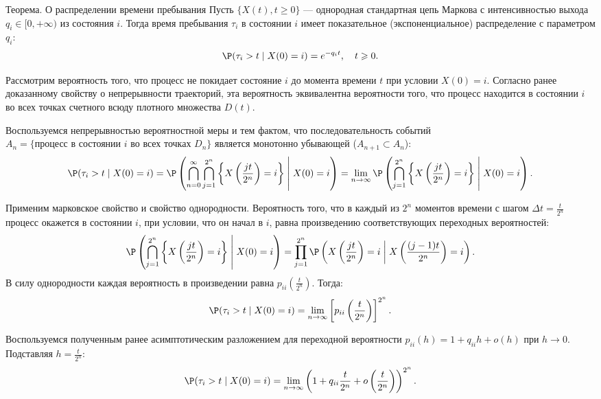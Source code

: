 \begin{theorem}{Теорема. О распределении времени пребывания}
    Пусть $\{X(t), t \geqslant 0\}$ — однородная стандартная цепь Маркова с интенсивностью выхода $q_i \in [0, +\infty)$ из состояния $i$. Тогда время пребывания $\tau_i$ в состоянии $i$ имеет показательное (экспоненциальное) распределение с параметром $q_i$:
    \[
        \P(\tau_i > t \mid X(0) = i) = e^{-q_i t}, \quad t \geqslant 0.
    \]
\end{theorem}

\begin{tproof}
    Рассмотрим вероятность того, что процесс не покидает состояние $i$ до момента времени $t$ при условии $X(0)=i$. Согласно ранее доказанному свойству о непрерывности траекторий, эта вероятность эквивалентна вероятности того, что процесс находится в состоянии $i$ во всех точках счетного всюду плотного множества $D(t)$.
    
    Воспользуемся непрерывностью вероятностной меры и тем фактом, что последовательность событий $A_n = \{ \text{процесс в состоянии } i \text{ во всех точках } D_n \}$ является монотонно убывающей ($A_{n+1} \subset A_n$):
    \[
        \P(\tau_i > t \mid X(0)=i) = \P\left( \bigcap_{n=0}^{\infty} \bigcap_{j=1}^{2^n} \left\{ X\left( \frac{jt}{2^n} \right) = i \right\} \;\middle|\; X(0)=i \right) = \linebreak \lim_{n \to \infty} \P\left( \bigcap_{j=1}^{2^n} \left\{ X\left( \frac{jt}{2^n} \right) = i \right\} \;\middle|\; X(0)=i \right).
    \]

    Применим марковское свойство и свойство однородности. Вероятность того, что в каждый из $2^n$ моментов времени с шагом $\Delta t = \frac{t}{2^n}$ процесс окажется в состоянии $i$, при условии, что он начал в $i$, равна произведению соответствующих переходных вероятностей:
    \[
        \P\left( \bigcap_{j=1}^{2^n} \left\{ X\left( \frac{jt}{2^n} \right) = i \right\} \;\middle|\; X(0)=i \right) = \prod_{j=1}^{2^n} \P\left( X\left( \frac{jt}{2^n} \right) = i \;\middle|\; X\left( \frac{(j-1)t}{2^n} \right) = i \right).
    \]
    В силу однородности каждая вероятность в произведении равна $p_{ii}\left( \frac{t}{2^n} \right)$. Тогда:
    \[
        \P(\tau_i > t \mid X(0)=i) = \lim_{n \to \infty} \left[ p_{ii}\left( \frac{t}{2^n} \right) \right]^{2^n}.
    \]

    Воспользуемся полученным ранее асимптотическим разложением для переходной вероятности $p_{ii}(h) = 1 + q_{ii} h + o(h)$ при $h \to 0$. Подставляя $h = \frac{t}{2^n}$:
    \[
        \P(\tau_i > t \mid X(0)=i) = \lim_{n \to \infty} \left( 1 + q_{ii} \frac{t}{2^n} + o\left( \frac{t}{2^n} \right) \right)^{2^n}.
    \]


\end{tproof}
